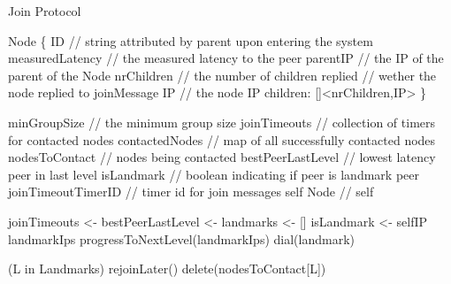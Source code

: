 





\begin{algorithm}
\begin{algorithmic}[1]
    \caption{Join Protocol}
    \asdtypes
        \State Node \{
        \Indent
        \State     ID // string attributed by parent upon entering the system
        \State     measuredLatency // the measured latency to the peer
        \State     parentIP // the IP of the parent of the Node
        \State     nrChildren // the number of children
        \State     replied // wether the node replied to joinMessage
        \State     IP // the node IP
        \State     children: []<nrChildren,IP> 
        \EndIndent
        \State \}
    \asdend


    \asdstate
        \State minGroupSize // the minimum group size
        \State joinTimeouts // collection of timers for contacted nodes
        \State contactedNodes // map of all successfully contacted nodes
        \State nodesToContact // nodes being contacted
        \State bestPeerLastLevel // lowest latency peer in last level
        \State isLandmark // boolean indicating if peer is landmark peer
        \State joinTimeoutTimerID // timer id for join messages
        \State self Node // self
    \asdend

        \State joinTimeouts <- {}
        \State bestPeerLastLevel <- {}
        \State landmarks <- []
        \State isLandmark <- selfIP \asdin landmarkIps
        \asdif[isLandmark]
            \State progressToNextLevel(landmarkIps)
        \asdelsea 
                \State dial(landmark)
            \asdend
        \asdend
    \asdend

    \asdupon[JoinTimeoutTimer(L)]
        \asdif (L in Landmarks)
        \State rejoinLater()
        \asdelsea
            \State delete(nodesToContact[L])
        \asdend
    \asdend


\end{algorithmic}
\end{algorithm}
